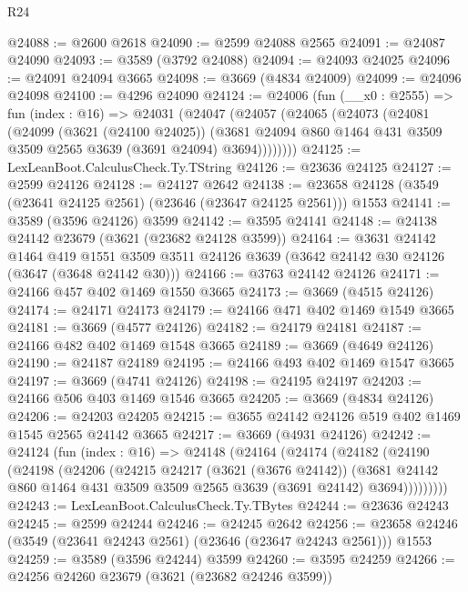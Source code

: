 \begin{lexlean}{R24}
\begin{coremodule}
@24088 := @2600 @2618
@24090 := @2599 @24088 @2565
@24091 := @24087 @24090
@24093 := @3589 (@3792 @24088)
@24094 := @24093 @24025
@24096 := @24091 @24094 @3665
@24098 := @3669 (@4834 @24009)
@24099 := @24096 @24098
@24100 := @4296 @24090
@24124 := @24006
    (fun (__x0 : @2555) =>
    fun (index : @16) =>
    @24031
      (@24047
        (@24057
          (@24065
            (@24073
              (@24081
                (@24099
                  (@3621 (@24100 @24025))
                  (@3681 @24094 @860 @1464 @431 @3509 @3509 @2565 @3639 (@3691 @24094) @3694))))))))
@24125 := LexLeanBoot.CalculusCheck.Ty.TString
@24126 := @23636 @24125
@24127 := @2599 @24126
@24128 := @24127 @2642
@24138 := @23658 @24128 (@3549 (@23641 @24125 @2561) (@23646 (@23647 @24125 @2561))) @1553
@24141 := @3589 (@3596 @24126) @3599
@24142 := @3595 @24141
@24148 := @24138 @24142 @23679 (@3621 (@23682 @24128 @3599))
@24164 := @3631
    @24142
    @1464
    @419
    @1551
    @3509
    @3511
    @24126
    @3639
    (@3642 @24142 @30 @24126 (@3647 (@3648 @24142 @30)))
@24166 := @3763 @24142 @24126
@24171 := @24166 @457 @402 @1469 @1550 @3665
@24173 := @3669 (@4515 @24126)
@24174 := @24171 @24173
@24179 := @24166 @471 @402 @1469 @1549 @3665
@24181 := @3669 (@4577 @24126)
@24182 := @24179 @24181
@24187 := @24166 @482 @402 @1469 @1548 @3665
@24189 := @3669 (@4649 @24126)
@24190 := @24187 @24189
@24195 := @24166 @493 @402 @1469 @1547 @3665
@24197 := @3669 (@4741 @24126)
@24198 := @24195 @24197
@24203 := @24166 @506 @403 @1469 @1546 @3665
@24205 := @3669 (@4834 @24126)
@24206 := @24203 @24205
@24215 := @3655 @24142 @24126 @519 @402 @1469 @1545 @2565 @24142 @3665
@24217 := @3669 (@4931 @24126)
@24242 := @24124
    (fun (index : @16) =>
    @24148
      (@24164
        (@24174
          (@24182
            (@24190
              (@24198
                (@24206
                  (@24215
                    @24217
                    (@3621 (@3676 @24142))
                    (@3681
                      @24142
                      @860
                      @1464
                      @431
                      @3509
                      @3509
                      @2565
                      @3639
                      (@3691 @24142)
                      @3694)))))))))
@24243 := LexLeanBoot.CalculusCheck.Ty.TBytes
@24244 := @23636 @24243
@24245 := @2599 @24244
@24246 := @24245 @2642
@24256 := @23658 @24246 (@3549 (@23641 @24243 @2561) (@23646 (@23647 @24243 @2561))) @1553
@24259 := @3589 (@3596 @24244) @3599
@24260 := @3595 @24259
@24266 := @24256 @24260 @23679 (@3621 (@23682 @24246 @3599))

\end{coremodule}
\end{lexlean}
